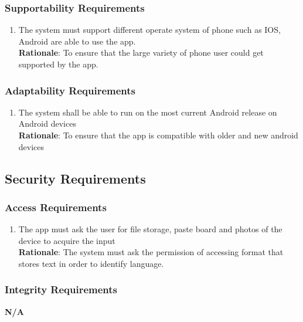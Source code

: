 \subsubsection{Supportability Requirements}
\label{ssub:supportability_requirements}
\begin{enumerate}[{MS-S}1. ]
	\item The system must support different operate system of phone such as IOS, Android are able to use the app. 
	\\ \textbf{Rationale}: To ensure that the large variety of phone user could get supported by the app. 
\end{enumerate}

\subsubsection{Adaptability Requirements}
\label{ssub:adaptability_requirements}
\begin{enumerate}[{MS-A}1. ]
	\item The system shall be able to run on the most current Android release on Android devices 
	\\ \textbf{Rationale}: To ensure that the app is compatible with older and new android devices
\end{enumerate}


\subsection{Security Requirements}
\label{sub:security_requirements}

\subsubsection{Access Requirements}
\label{ssub:access_requirements}
\begin{enumerate}[{SR-AC}1. ]
	\item The app must ask the user for file storage, paste board and photos of the device to acquire the input 
	\\ \textbf{Rationale}: The system must ask the permission of accessing format that stores text in order to identify language. 
\end{enumerate}

\subsubsection{Integrity Requirements}
\label{ssub:integrity_requirements}
\textbf{N/A}

